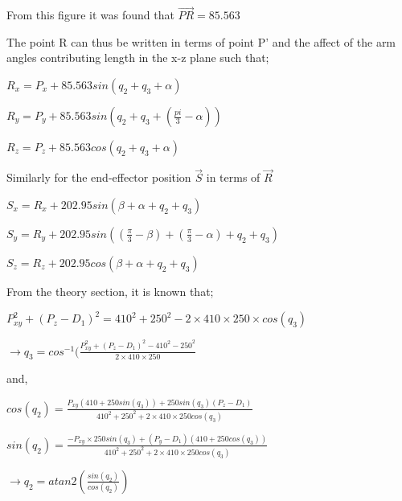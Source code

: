 \documentclass[12pt,openany,a4paper]{book}
\begin{document}
From this figure it was found that $\vec{PR} = 85.563$

The point R can thus be written in terms of point P' and the affect of the arm angles contributing length in the x-z plane such that;

\vspace{\baselineskip}

$R_x = P_x + 85.563 sin( q_2 + q_3 + \alpha)$

$R_y = P_y + 85.563 sin( q_2 + q_3 + (\frac{pi}{3} - \alpha))$

$R_z = P_z + 85.563 cos( q_2 + q_3 + \alpha)$

\vspace{\baselineskip}

Similarly for the end-effector position $\vec{S}$ in terms of $\vec{R}$

\vspace{\baselineskip}

$S_x = R_x + 202.95 sin( \beta + \alpha + q_2 + q_3)$

$S_y = R_y + 202.95 sin ( (\frac{\pi}{3} - \beta) + (\frac{\pi}{3} - \alpha) + q_2 + q_3)$

$S_z = R_z + 202.95 cos( \beta + \alpha + q_2 + q_3)$ 

\vspace{\baselineskip}

From the theory section, it is known that;

\vspace{\baselineskip}

$P_{xy}^2 + (P_z - D_1)^2 = 410^2 + 250^2 - 2 \times 410 \times 250 \times cos(q_3)$

$\rightarrow q_3 = cos^{-1} ( \frac{P_{xy}^2 + (P_z - D_1)^2 - 410^2 -250^2 }{2 \times 410 \times 250}$

\vspace{\baselineskip}

and,

\vspace{\baselineskip}

$cos(q_2) = \frac{ P_{xy} (410 + 250 sin (q_3)) + 250 sin(q_3)(P_z - D_1) }{410^2 + 250^2 + 2 \times 410 \times 250 cos(q_3)}$

$sin(q_2) = \frac{-P_{xy} \times 250 sin(q_3) + (P_y - D_1)(410 + 250 cos(q_3))}{410^2 + 250^2 + 2 \times 410 \times 250 cos(q_3)}$

$\rightarrow q_2 = atan2( \frac{sin(q_2)}{cos(q_2)})$

\vspace{\baselineskip}
\end{document}

